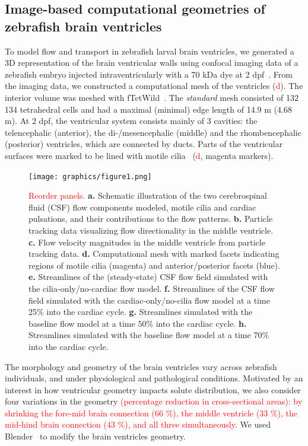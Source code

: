 \documentclass[fleqn]{wlscirep}
\newcommand{\fixme}[1]{\textcolor{red}{#1}}
\begin{document}
\subsection*{Image-based computational geometries of zebrafish brain ventricles}
To model flow and transport in zebrafish larval brain ventricles, we generated a
3D representation of the brain ventricular walls using confocal imaging data of a zebrafish embryo
injected intraventricularly with a 70 kDa dye at 2 dpf~\cite{Olstad2019CiliaryDevelopment}. 
From the imaging data, we constructed a computational mesh of the ventricles (\fixme{d}).
The interior volume was meshed with fTetWild~\cite{Hu2020FastWild}. 
The \emph{standard} mesh consisted of 132 134 tetrahedral cells and had a
maximal (minimal) edge length of 14.9 \textmu m (4.68 \textmu m). 
At 2 dpf, the ventricular system consists mainly of 3 cavities: the telencephalic (anterior),
the di-/mesencephalic (middle) and the rhombencephalic (posterior) ventricles, which are connected by ducts. 
Parts of the ventricular surfaces were marked to be lined with
motile cilia~\cite{Olstad2019CiliaryDevelopment} (\fixme{d}, magenta markers).
\begin{figure}%
    \centering
    \texttt{[image: graphics/figure1.png]}
    \caption{\fixme{Reorder panels.} 
    \textbf{a.} Schematic illustration of the two cerebrospinal fluid (CSF) flow components modeled,
    motile cilia and cardiac pulsations, and their contributions to the flow patterns.
    \textbf{b.} Particle tracking data visualizing flow directionality in the middle ventricle.
    \textbf{c.} Flow velocity magnitudes in the middle ventricle from particle tracking data.
    \textbf{d.} Computational mesh with marked facets indicating regions of motile cilia (magenta) and
    anterior/posterior facets (blue).
    \textbf{e.} Streamlines of the (steady-state) CSF flow field simulated with the
    cilia-only/no-cardiac flow model.
    \textbf{f.} Streamlines of the CSF flow field simulated with the cardiac-only/no-cilia flow
    model at a time 25\% into the cardiac cycle. %
    \textbf{g.} Streamlines simulated with the baseline flow model at
    a time 50\% into the cardiac cycle. %
    \textbf{h.} Streamlines simulated with the baseline flow model at
    a time 70\% into the cardiac cycle. %
    }
    \label{fig:fig1}
\end{figure}

The morphology and geometry of the brain ventricles vary across zebrafish
individuals, and under physiological and pathological conditions. 
Motivated by an interest in how ventricular geometry impacts solute distribution,
we also consider four variations in the geometry \fixme{(percentage reduction in cross-sectional areas):
by shrinking the fore-mid brain connection (66 \%), 
the middle ventricle (33 \%), the mid-hind brain connection (43 \%), and all three simultaneously.} 
We used Blender~\cite{Community2018BlenderPackage} to modify the brain ventricles geometry.
\end{document}
